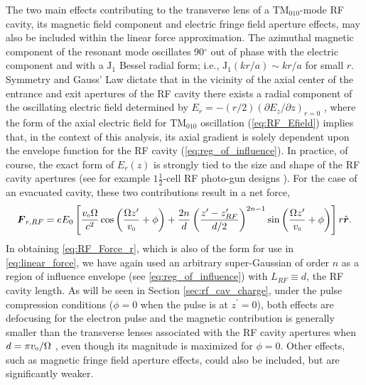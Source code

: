The two main effects contributing to the transverse lens of a $\text{TM}_{010}$-mode RF cavity, its magnetic field component and electric fringe field aperture effects, may also be included within the linear force approximation.
The azimuthal magnetic component of the resonant mode oscillates 90$^{\circ}$ out of phase with the electric component and with a $\operatorname{ J_{1} }$ Bessel radial form; i.e., $ \operatorname{ J_{1} }( k r / a ) \sim k r / a $ for small $r$.
Symmetry and Gauss' Law dictate that in the vicinity of the axial center of the entrance and exit apertures of the RF cavity there exists a radial component of the oscillating electric field determined by $ E_{r} = -\left ( r / 2 \right ) \left ( \partial E_{z} / \partial z \right )_{r=0} $ \cite{kim_rf_1989}, where the form of the axial electric field for $\text{TM}_{010}$ oscillation (\ref{eq:RF_Efield}) implies that, in the context of this analysis, its axial gradient is solely dependent upon the envelope function for the RF cavity (\ref{eq:reg_of_influence}).
In practice, of course, the exact form of $E_{r}(z)$ is strongly tied to the size and shape of the RF cavity apertures (see for example $1 \frac{1}{2}$-cell RF photo-gun designs \cite{mcdonald_design_1988}). 
For the case of an evacuated cavity, these two contributions result in a net force,
\begin{equation} \label{eq:RF_Force_r}
  \boldsymbol{F}_{ r , RF } = e E_{0} \left [ 
    \frac{ v_{{\scriptscriptstyle 0}} \Omega }{c^{2}} \cos \left ( \frac{ \Omega z^{\prime} }{ v_{{\scriptscriptstyle 0}} } + \phi \right ) + \frac{2 n}{d} \left ( \frac{z^{\prime} - z^{\prime}_{RF}}{d / 2} \right )^{2 n - 1} \sin \left ( \frac{ \Omega z^{\prime} }{ v_{{\scriptscriptstyle 0}} } + \phi \right )
   \right ] r \hat{\operatorname{ \boldsymbol{r} }} \text{.}
\end{equation}
In obtaining \ref{eq:RF_Force_r}, which is also of the form for use in \ref{eq:linear_force}, we have again used an arbitrary super-Gaussian of order $n$ as a region of influence envelope (see \ref{eq:reg_of_influence}) with $L_{RF} \equiv d$, the RF cavity length.
As will be seen in Section \ref{sec:rf_cav_charge}, under the pulse compression conditions ($\phi = 0$ when the pulse is at $z^{\prime} = 0$), both effects are defocusing for the electron pulse and the magnetic contribution is generally smaller than the transverse lenses associated with the RF cavity apertures when $ d = \pi v_{{\scriptscriptstyle 0}} / \Omega $ \cite{kim_rf_1989}, even though its magnitude is maximized for $\phi = 0$.
Other effects, such as magnetic fringe field aperture effects, could also be included, but are significantly weaker.

